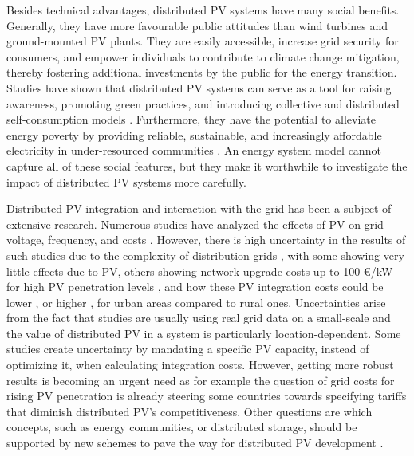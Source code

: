 \documentclass[review]{elsarticle}
\begin{document}
	Besides technical advantages, distributed PV systems have many social benefits. Generally, they have more favourable public attitudes than wind turbines and ground-mounted PV plants. They are easily accessible, increase grid security for consumers, and empower individuals to contribute to climate change mitigation, thereby fostering additional investments by the public for the energy transition. Studies have shown that distributed PV systems can serve as a tool for raising awareness, promoting green practices, and introducing collective and distributed self-consumption models \cite{IEAPVPS_2021}. Furthermore, they have the potential to alleviate energy poverty by providing reliable, sustainable, and increasingly affordable electricity in under-resourced communities \cite{ o_2021, o_2021impact, fox_2023}. An energy system model cannot capture all of these social features, but they make it worthwhile to investigate the impact of distributed PV systems more carefully.
	
	Distributed PV integration and interaction with the grid has been a subject of extensive research. Numerous studies have analyzed the effects of PV on grid voltage, frequency, and costs \cite{ gupta_2021, alboaouh_2020, karimi_2016, gandhi_2020, olowu_2018} . However, there is high uncertainty in the results of such studies due to the complexity of distribution grids \cite{ burger_2019, horowitz_2018distribution} , with some showing very little effects due to PV, others showing network upgrade costs up to 100 €/kW for high PV penetration levels \cite{lumbreras_2018, horowitz_2018, cohen_2016effects, cohen_2016effects2} , and how these PV integration costs could be lower \cite{gupta_2021} , or higher \cite{fernandez_2010} , for urban areas compared to rural ones. Uncertainties arise from the fact that studies are usually using real grid data on a small-scale and the value of distributed PV in a system is particularly location-dependent. Some studies create uncertainty by mandating a specific PV capacity, instead of optimizing it, when calculating integration costs. However, getting more robust results is becoming an urgent need as for example the question of grid costs for rising PV penetration is already steering some countries towards specifying tariffs that diminish distributed PV's competitiveness. Other questions are which concepts, such as energy communities, or distributed storage, should be supported by new schemes to pave the way for distributed PV development \cite{IEAPVPS_2021}.
	
\end{document}
